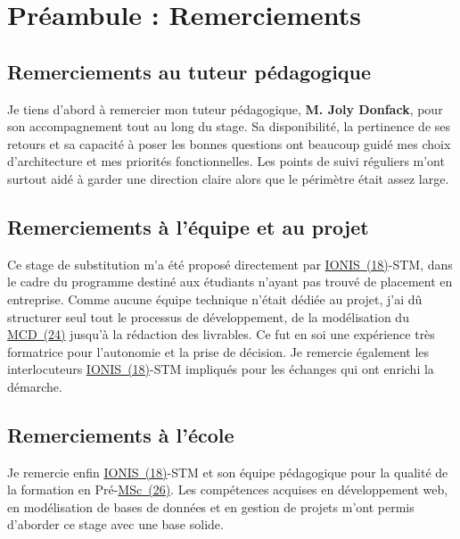 \documentclass[12pt,a4paper]{report}
\begin{document}
\newpage
\chapter*{Préambule : Remerciements}

\section*{Remerciements au tuteur pédagogique}

Je tiens d'abord à remercier mon tuteur pédagogique, \textbf{M. Joly Donfack}, pour son accompagnement tout au long du stage. Sa disponibilité, la pertinence de ses retours et sa capacité à poser les bonnes questions ont beaucoup guidé mes choix d'architecture et mes priorités fonctionnelles. Les points de suivi réguliers m'ont surtout aidé à garder une direction claire alors que le périmètre était assez large.

\section*{Remerciements à l'équipe et au projet}

Ce stage de substitution m'a été proposé directement par \hyperlink{abbr-IONIS}{IONIS~(18)}-STM, dans le cadre du programme destiné aux étudiants n'ayant pas trouvé de placement en entreprise. Comme aucune équipe technique n'était dédiée au projet, j'ai dû structurer seul tout le processus de développement, de la modélisation du \hyperlink{abbr-MCD}{MCD~(24)} jusqu'à la rédaction des livrables. Ce fut en soi une expérience très formatrice pour l'autonomie et la prise de décision. Je remercie également les interlocuteurs \hyperlink{abbr-IONIS}{IONIS~(18)}-STM impliqués pour les échanges qui ont enrichi la démarche.

\section*{Remerciements à l'école}

Je remercie enfin \hyperlink{abbr-IONIS}{IONIS~(18)}-STM et son équipe pédagogique pour la qualité de la formation en Pré-\hyperlink{abbr-MSc}{MSc~(26)}. Les compétences acquises en développement web, en modélisation de bases de données et en gestion de projets m'ont permis d'aborder ce stage avec une base solide.
\end{document}
